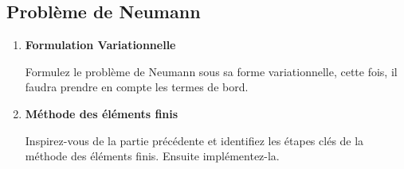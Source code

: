 \documentclass[a4paper,12pt]{article}
\begin{document}
\subsection*{Problème de Neumann}

\begin{enumerate}
    \item \textbf{Formulation Variationnelle}

         Formulez le problème de Neumann sous sa forme variationnelle, cette fois, il faudra prendre en compte les termes de bord.

    \item \textbf{Méthode des éléments finis}

        Inspirez-vous de la partie précédente et identifiez les étapes clés de la méthode des éléments finis. Ensuite implémentez-la.        
\end{enumerate}
\end{document}
